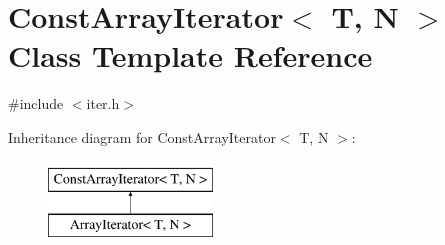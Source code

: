 \hypertarget{classConstArrayIterator}{}\section{Const\+Array\+Iterator$<$ T, N $>$ Class Template Reference}
\label{classConstArrayIterator}


{\ttfamily \#include $<$iter.\+h$>$}

Inheritance diagram for Const\+Array\+Iterator$<$ T, N $>$\+:\begin{figure}[H]
\begin{center}
\leavevmode
\includegraphics[height=2.000000cm]{classConstArrayIterator}
\end{center}
\end{figure}
